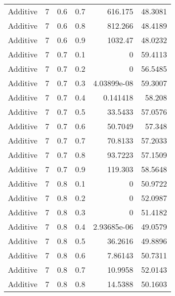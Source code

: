 \documentclass{article}
\begin{document}
\begin{longtable}[H]{lrrrrr}
 Additive       &       7 &   0.6 &            0.7 &    616.175       &         48.3081 \\
 Additive       &       7 &   0.6 &            0.8 &    812.266       &         48.4189 \\
 Additive       &       7 &   0.6 &            0.9 &   1032.47        &         48.0232 \\
 Additive       &       7 &   0.7 &            0.1 &      0           &         59.4113 \\
 Additive       &       7 &   0.7 &            0.2 &      0           &         56.5485 \\
 Additive       &       7 &   0.7 &            0.3 &      4.03899e-08 &         59.3007 \\
 Additive       &       7 &   0.7 &            0.4 &      0.141418    &         58.208  \\
 Additive       &       7 &   0.7 &            0.5 &     33.5433      &         57.0576 \\
 Additive       &       7 &   0.7 &            0.6 &     50.7049      &         57.348  \\
 Additive       &       7 &   0.7 &            0.7 &     70.8133      &         57.2033 \\
 Additive       &       7 &   0.7 &            0.8 &     93.7223      &         57.1509 \\
 Additive       &       7 &   0.7 &            0.9 &    119.303       &         58.5648 \\
 Additive       &       7 &   0.8 &            0.1 &      0           &         50.9722 \\
 Additive       &       7 &   0.8 &            0.2 &      0           &         52.0987 \\
 Additive       &       7 &   0.8 &            0.3 &      0           &         51.4182 \\
 Additive       &       7 &   0.8 &            0.4 &      2.93685e-06 &         49.0579 \\
 Additive       &       7 &   0.8 &            0.5 &     36.2616      &         49.8896 \\
 Additive       &       7 &   0.8 &            0.6 &      7.86143     &         50.7311 \\
 Additive       &       7 &   0.8 &            0.7 &     10.9958      &         52.0143 \\
 Additive       &       7 &   0.8 &            0.8 &     14.5388      &         50.1603 \\

\end{longtable}
\end{document}
